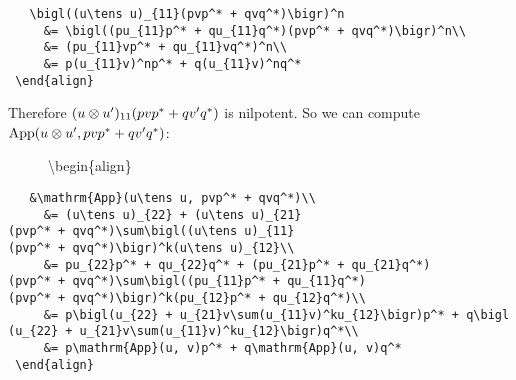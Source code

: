 \texttt{~~~\textbackslash{}bigl((u\textbackslash{}tens~u\textquotesingle{})\_\{11\}(pvp\^{}*~+~qv\textquotesingle{}q\^{}*)\textbackslash{}bigr)\^{}n}\\
\texttt{~~~~~\&=~\textbackslash{}bigl((pu\_\{11\}p\^{}*~+~qu\textquotesingle{}\_\{11\}q\^{}*)(pvp\^{}*~+~qv\textquotesingle{}q\^{}*)\textbackslash{}bigr)\^{}n\textbackslash{}\textbackslash{}}\\
\texttt{~~~~~\&=~(pu\_\{11\}vp\^{}*~+~qu\textquotesingle{}\_\{11\}v\textquotesingle{}q\^{}*)\^{}n\textbackslash{}\textbackslash{}}\\
\texttt{~~~~~\&=~p(u\_\{11\}v)\^{}np\^{}*~+~q(u\textquotesingle{}\_\{11\}v\textquotesingle{})\^{}nq\^{}*}\\
\texttt{~\textbackslash{}end\{align\}}

Therefore \((u\otimes u')_{11}(pvp^* + qv'q^*)\) is nilpotent. So we can
compute \(\mathrm{App}(u\otimes u', pvp^* + qv'q^*)\):

\begin{description}
\item[]
\textbackslash{}begin\{align\}
\end{description}

\texttt{~~~\&\textbackslash{}mathrm\{App\}(u\textbackslash{}tens~u\textquotesingle{},~pvp\^{}*~+~qv\textquotesingle{}q\^{}*)\textbackslash{}\textbackslash{}}\\
\texttt{~~~~~\&=~(u\textbackslash{}tens~u\textquotesingle{})\_\{22\}~+~(u\textbackslash{}tens~u\textquotesingle{})\_\{21\}(pvp\^{}*~+~qv\textquotesingle{}q\^{}*)\textbackslash{}sum\textbackslash{}bigl((u\textbackslash{}tens~u\textquotesingle{})\_\{11\}(pvp\^{}*~+~qv\textquotesingle{}q\^{}*)\textbackslash{}bigr)\^{}k(u\textbackslash{}tens~u\textquotesingle{})\_\{12\}\textbackslash{}\textbackslash{}}\\
\texttt{~~~~~\&=~pu\_\{22\}p\^{}*~+~qu\textquotesingle{}\_\{22\}q\^{}*~+~(pu\_\{21\}p\^{}*~+~qu\textquotesingle{}\_\{21\}q\^{}*)(pvp\^{}*~+~qv\textquotesingle{}q\^{}*)\textbackslash{}sum\textbackslash{}bigl((pu\_\{11\}p\^{}*~+~qu\textquotesingle{}\_\{11\}q\^{}*)(pvp\^{}*~+~qv\textquotesingle{}q\^{}*)\textbackslash{}bigr)\^{}k(pu\_\{12\}p\^{}*~+~qu\textquotesingle{}\_\{12\}q\^{}*)\textbackslash{}\textbackslash{}}\\
\texttt{~~~~~\&=~p\textbackslash{}bigl(u\_\{22\}~+~u\_\{21\}v\textbackslash{}sum(u\_\{11\}v)\^{}ku\_\{12\}\textbackslash{}bigr)p\^{}*~+~q\textbackslash{}bigl(u\textquotesingle{}\_\{22\}~+~u\textquotesingle{}\_\{21\}v\textquotesingle{}\textbackslash{}sum(u\textquotesingle{}\_\{11\}v\textquotesingle{})\^{}ku\textquotesingle{}\_\{12\}\textbackslash{}bigr)q\^{}*\textbackslash{}\textbackslash{}}\\
\texttt{~~~~~\&=~p\textbackslash{}mathrm\{App\}(u,~v)p\^{}*~+~q\textbackslash{}mathrm\{App\}(u\textquotesingle{},~v\textquotesingle{})q\^{}*}\\
\texttt{~\textbackslash{}end\{align\}}

